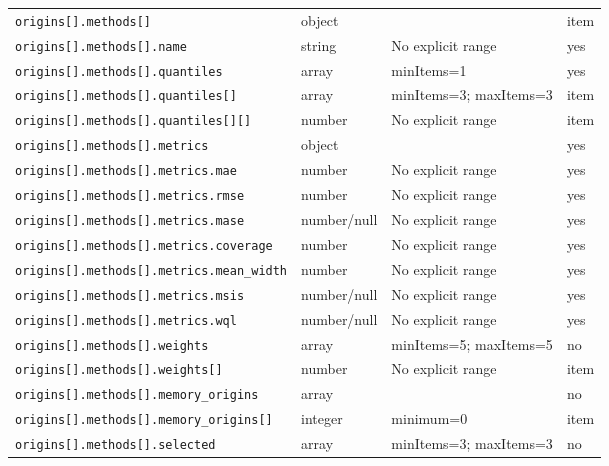 \begin{longtable}{@{}p{}p{}p{}p{}@{}}
\texttt{origins[].\allowbreak{}methods[]} & object &  & item\\
\texttt{origins[].\allowbreak{}methods[].\allowbreak{}name} & string & No explicit range & yes\\
\texttt{origins[].\allowbreak{}methods[].\allowbreak{}quantiles} & array & minItems=1 & yes\\
\texttt{origins[].\allowbreak{}methods[].\allowbreak{}quantiles[]} & array & minItems=3; maxItems=3 & item\\
\texttt{origins[].\allowbreak{}methods[].\allowbreak{}quantiles[][]} & number & No explicit range & item\\
\texttt{origins[].\allowbreak{}methods[].\allowbreak{}metrics} & object &  & yes\\
\texttt{origins[].\allowbreak{}methods[].\allowbreak{}metrics.\allowbreak{}mae} & number & No explicit range & yes\\
\texttt{origins[].\allowbreak{}methods[].\allowbreak{}metrics.\allowbreak{}rmse} & number & No explicit range & yes\\
\texttt{origins[].\allowbreak{}methods[].\allowbreak{}metrics.\allowbreak{}mase} & number/null & No explicit range & yes\\
\texttt{origins[].\allowbreak{}methods[].\allowbreak{}metrics.\allowbreak{}coverage} & number & No explicit range & yes\\
\texttt{origins[].\allowbreak{}methods[].\allowbreak{}metrics.\allowbreak{}mean\_\allowbreak{}width} & number & No explicit range & yes\\
\texttt{origins[].\allowbreak{}methods[].\allowbreak{}metrics.\allowbreak{}msis} & number/null & No explicit range & yes\\
\texttt{origins[].\allowbreak{}methods[].\allowbreak{}metrics.\allowbreak{}wql} & number/null & No explicit range & yes\\
\texttt{origins[].\allowbreak{}methods[].\allowbreak{}weights} & array & minItems=5; maxItems=5 & no\\
\texttt{origins[].\allowbreak{}methods[].\allowbreak{}weights[]} & number & No explicit range & item\\
\texttt{origins[].\allowbreak{}methods[].\allowbreak{}memory\_\allowbreak{}origins} & array &  & no\\
\texttt{origins[].\allowbreak{}methods[].\allowbreak{}memory\_\allowbreak{}origins[]} & integer & minimum=0 & item\\
\texttt{origins[].\allowbreak{}methods[].\allowbreak{}selected} & array & minItems=3; maxItems=3 & no\\

\end{longtable}
